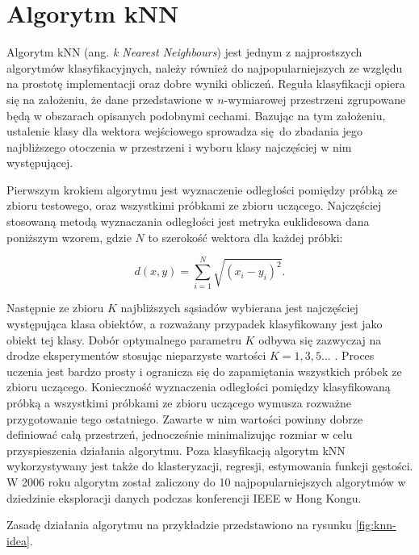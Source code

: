 \section{Algorytm kNN}
\label{chap:knn}
Algorytm kNN (ang. \textit{k Nearest Neighbours})  jest jednym z najprostszych algorytmów klasyfikacyjnych, należy również do najpopularniejszych ze względu na prostotę implementacji oraz dobre wyniki obliczeń. Reguła klasyfikacji opiera się na założeniu, że dane przedstawione w $n$-wymiarowej przestrzeni zgrupowane będą w obszarach opisanych podobnymi cechami. Bazując na tym założeniu, ustalenie klasy dla wektora wejściowego sprowadza się do zbadania jego najbliższego otoczenia w przestrzeni i wyboru klasy najczęściej w nim występującej.

Pierwszym krokiem algorytmu jest wyznaczenie odległości pomiędzy próbką ze zbioru testowego, oraz wszystkimi próbkami ze zbioru uczącego. Najczęściej stosowaną metodą wyznaczania odległości jest metryka euklidesowa dana poniższym wzorem, gdzie $N$ to szerokość wektora dla każdej próbki:

\begin{equation}
d(x,y) = \sum_{i=1}^{N} \sqrt{(x_i - y_i)^2}.
\end{equation}

Następnie ze zbioru $K$ najbliższych sąsiadów wybierana jest najczęściej występująca klasa obiektów, a rozważany przypadek klasyfikowany jest jako obiekt tej klasy. Dobór optymalnego parametru $K$ odbywa się zazwyczaj na drodze eksperymentów stosując nieparzyste wartości $K=1,3,5...$ . Proces uczenia jest bardzo prosty i ogranicza się do zapamiętania wszystkich próbek ze zbioru uczącego. Konieczność wyznaczenia odległości pomiędzy klasyfikowaną próbką a wszystkimi próbkami ze zbioru uczącego wymusza rozważne przygotowanie tego ostatniego. Zawarte w nim wartości powinny dobrze definiować całą przestrzeń, jednocześnie minimalizując rozmiar w celu przyspieszenia działania algorytmu. Poza klasyfikacją algorytm kNN wykorzystywany jest także do klasteryzacji, regresji, estymowania funkcji gęstości. W 2006 roku algorytm został zaliczony do 10 najpopularniejszych algorytmów w dziedzinie eksploracji danych podczas konferencji IEEE w Hong Kongu.

Zasadę działania algorytmu na przykładzie przedstawiono na rysunku \ref{fig:knn-idea}.

